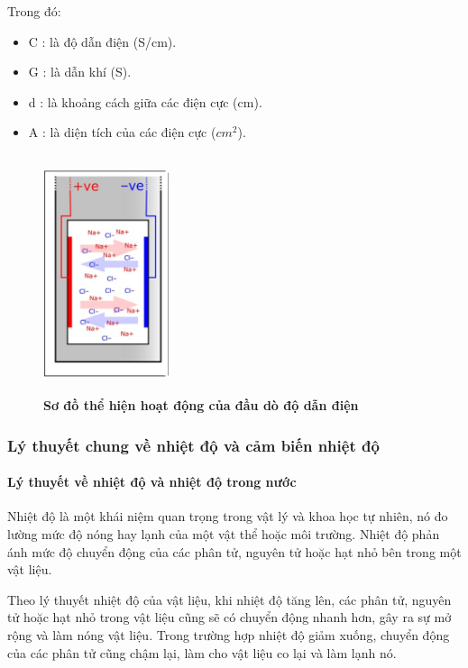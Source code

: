 \documentclass{article} %
\begin{document}
	Trong đó:
	\begin{itemize}
		\item  C : là độ dẫn điện (S/cm).
		\item  G : là dẫn khí (S).
		\item  d : là khoảng cách giữa các điện cực (cm).
		\item  A : là diện tích của các điện cực (${cm}^{2}$).
	\end{itemize}
	
	\begin{figure}[!ht]
		\centering
		\includegraphics[width=3.7cm,height=7cm]{Images/HD.png}
		\caption[Sơ đồ thể hiện hoạt động của đầu dò độ dẫn điện\cite{EC}]{\bfseries \fontsize{12pt}{0pt}\selectfont Sơ đồ thể hiện hoạt động của đầu dò độ dẫn điện\cite{EC}}
		\label{ECActivity}
	\end{figure}
	
   \newpage
	\subsubsection{Lý thuyết chung về nhiệt độ và cảm biến nhiệt độ }
	\paragraph{Lý thuyết về nhiệt độ và nhiệt độ trong nước }\mbox{}
	
	Nhiệt độ là một khái niệm quan trọng trong vật lý và khoa học tự nhiên, nó đo lường mức độ nóng hay lạnh của một vật thể hoặc môi trường. Nhiệt độ phản ánh mức độ chuyển động của các phân tử, nguyên tử hoặc hạt nhỏ bên trong một vật liệu.
	
	Theo lý thuyết nhiệt độ của vật liệu, khi nhiệt độ tăng lên, các phân tử, nguyên tử hoặc hạt nhỏ trong vật liệu cũng sẽ có chuyển động nhanh hơn, gây ra sự mở rộng và làm nóng vật liệu. Trong trường hợp nhiệt độ giảm xuống, chuyển động của các phân tử cũng chậm lại, làm cho vật liệu co lại và làm lạnh nó. 
	
\end{document}
